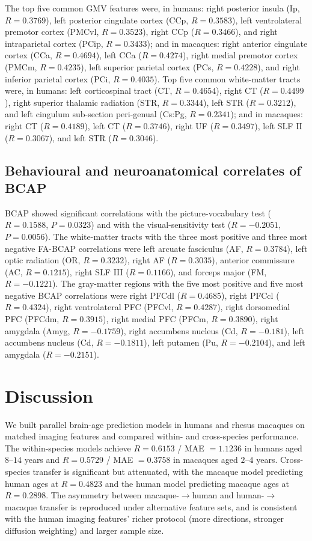 \documentclass[11pt]{article}
\begin{document}
The top five common GMV features were, in humans: right posterior insula (Ip, $R = 0.3769$), left posterior cingulate cortex (CCp, $R = 0.3583$), left ventrolateral premotor cortex (PMCvl, $R = 0.3523$), right CCp ($R = 0.3466$), and right intraparietal cortex (PCip, $R = 0.3433$); and in macaques: right anterior cingulate cortex (CCa, $R = 0.4694$), left CCa ($R = 0.4274$), right medial premotor cortex (PMCm, $R = 0.4235$), left superior parietal cortex (PCs, $R = 0.4228$), and right inferior parietal cortex (PCi, $R = 0.4035$). Top five common white-matter tracts were, in humans: left corticospinal tract (CT, $R = 0.4654$), right CT ($R = 0.4499$), right superior thalamic radiation (STR, $R = 0.3344$), left STR ($R = 0.3212$), and left cingulum sub-section peri-genual (Cs:Pg, $R = 0.2341$); and in macaques: right CT ($R = 0.4189$), left CT ($R = 0.3746$), right UF ($R = 0.3497$), left SLF II ($R = 0.3067$), and left STR ($R = 0.3046$).

\subsection{Behavioural and neuroanatomical correlates of BCAP}
BCAP showed significant correlations with the picture-vocabulary test ($R = 0.1588$, $P = 0.0323$) and with the visual-sensitivity test ($R = -0.2051$, $P = 0.0056$). The white-matter tracts with the three most positive and three most negative FA-BCAP correlations were left arcuate fasciculus (AF, $R = 0.3784$), left optic radiation (OR, $R = 0.3232$), right AF ($R = 0.3035$), anterior commissure (AC, $R = 0.1215$), right SLF III ($R = 0.1166$), and forceps major (FM, $R = -0.1221$). The gray-matter regions with the five most positive and five most negative BCAP correlations were right PFCdl ($R = 0.4685$), right PFCcl ($R = 0.4324$), right ventrolateral PFC (PFCvl, $R = 0.4287$), right dorsomedial PFC (PFCdm, $R = 0.3915$), right medial PFC (PFCm, $R = 0.3890$), right amygdala (Amyg, $R = -0.1759$), right accumbens nucleus (Cd, $R = -0.181$), left accumbens nucleus (Cd, $R = -0.1811$), left putamen (Pu, $R = -0.2104$), and left amygdala ($R = -0.2151$).

\section{Discussion}

We built parallel brain-age prediction models in humans and rhesus macaques on matched imaging features and compared within- and cross-species performance. The within-species models achieve $R = 0.6153$ / MAE $= 1.1236$ in humans aged $8$--$14$ years and $R = 0.5729$ / MAE $= 0.3758$ in macaques aged $2$--$4$ years. Cross-species transfer is significant but attenuated, with the macaque model predicting human ages at $R = 0.4823$ and the human model predicting macaque ages at $R = 0.2898$. The asymmetry between macaque-$\to$human and human-$\to$macaque transfer is reproduced under alternative feature sets, and is consistent with the human imaging features' richer protocol (more directions, stronger diffusion weighting) and larger sample size.
\end{document}
